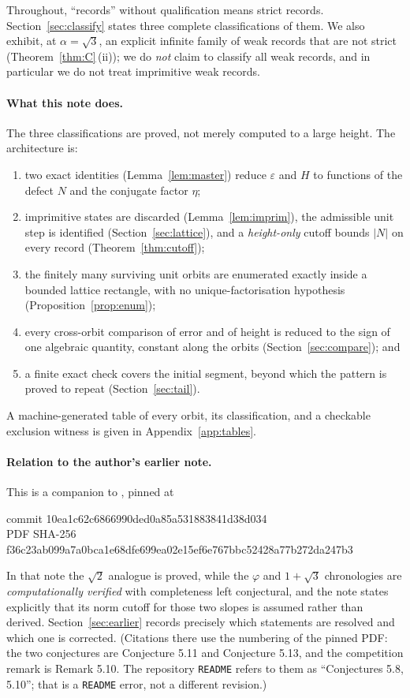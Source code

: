 \documentclass[11pt]{article}
\theoremstyle{definition}
\theoremstyle{remark}
\begin{document}
Throughout, ``records'' without qualification means strict records. Section~\ref{sec:classify}
states three complete classifications of them. We also exhibit, at $\alpha=\sqrt3$, an explicit
infinite family of weak records that are not strict (Theorem~\ref{thm:C}\,(ii)); we do
\emph{not} claim to classify all weak records, and in particular we do not treat imprimitive
weak records.

\paragraph{What this note does.}
The three classifications are proved, not merely computed to a large height. The architecture
is:
\begin{enumerate}\itemsep2pt
\item two exact identities (Lemma~\ref{lem:master}) reduce $\varepsilon$ and $H$ to functions
of the defect $N$ and the conjugate factor $\eta$;
\item imprimitive states are discarded (Lemma~\ref{lem:imprim}), the admissible unit step is
identified (Section~\ref{sec:lattice}), and a \emph{height-only} cutoff bounds $|N|$ on every
record (Theorem~\ref{thm:cutoff});
\item the finitely many surviving unit orbits are enumerated exactly inside a bounded lattice
rectangle, with no unique-factorisation hypothesis (Proposition~\ref{prop:enum});
\item every cross-orbit comparison of error and of height is reduced to the sign of one
algebraic quantity, constant along the orbits (Section~\ref{sec:compare}); and
\item a finite exact check covers the initial segment, beyond which the pattern is proved
to repeat (Section~\ref{sec:tail}).
\end{enumerate}
A machine-generated table of every orbit, its classification, and a checkable exclusion
witness is given in Appendix~\ref{app:tables}.

\paragraph{Relation to the author's earlier note.}
This is a companion to \cite{DeJesus2026}, pinned at
\begin{center}\small\ttfamily
commit 10ea1c62c6866990ded0a85a531883841d38d034\\
PDF SHA-256 f36c23ab099a7a0bca1e68dfe699ea02e15ef6e767bbc52428a77b272da247b3
\end{center}
\noindent In that note the
$\sqrt2$ analogue is proved, while the $\varphi$ and $1+\sqrt3$ chronologies are
\emph{computationally verified} with completeness left conjectural, and the note states
explicitly that its norm cutoff for those two slopes is assumed rather than derived.
Section~\ref{sec:earlier} records precisely which statements are resolved and which one is
corrected. (Citations there use the numbering of the pinned PDF: the two conjectures are
Conjecture 5.11 and Conjecture 5.13, and the competition remark is Remark 5.10. The
repository \texttt{README} refers to them as ``Conjectures 5.8, 5.10''; that is a
\texttt{README} error, not a different revision.)
\end{document}
